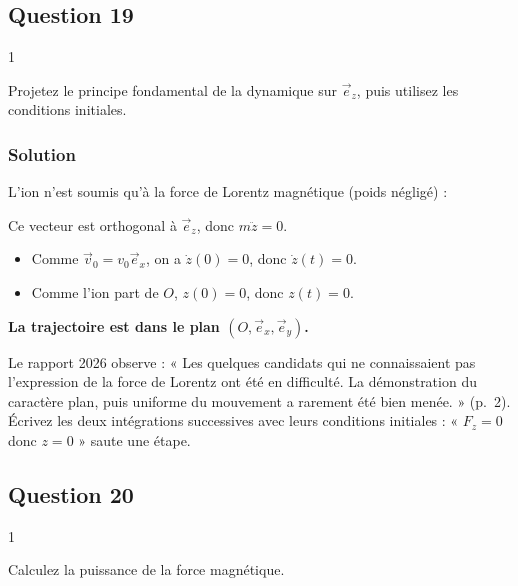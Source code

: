 \documentclass[11pt,a4paper]{article}
\providecommand{\tightlist}{\setlength{\itemsep}{0pt}\setlength{\parskip}{0pt}}
\newcommand{\equationajustee}[1]{%
  \sbox{\boiteequation}{$\displaystyle #1$}%
  \ifdim\wd\boiteequation>\linewidth
    \[\resizebox{\linewidth}{!}{\usebox{\boiteequation}}\]%
  \else
    \[#1\]%
  \fi}
\begin{document}
\hypertarget{question-19}{%
\subsection{Question 19}\label{question-19}}

\begin{indication}{1}

Projetez le principe fondamental de la dynamique sur \(\vec e_z\), puis utilisez les conditions initiales.

\end{indication}

\hypertarget{solution-18}{%
\subsubsection{Solution}\label{solution-18}}

L'ion n'est soumis qu'à la force de Lorentz magnétique (poids négligé) :

\equationajustee{m\frac{\mathrm d\vec v}{\mathrm dt}=e\vec v\wedge B\vec e_z}

Ce vecteur est orthogonal à \(\vec e_z\), donc \(m\ddot z=0\).

\begin{itemize}
\tightlist
\item
  Comme \(\vec v_0=v_0\vec e_x\), on a \(\dot z(0)=0\), donc \(\dot z(t)=0\).
\item
  Comme l'ion part de \(O\), \(z(0)=0\), donc \(z(t)=0\).
\end{itemize}

\textbf{La trajectoire est dans le plan \((O,\vec e_x,\vec e_y)\).}

\begin{jury}

Le rapport 2026 observe : « Les quelques candidats qui ne connaissaient pas l'expression de la force de Lorentz ont été en difficulté. La démonstration du caractère plan, puis uniforme du mouvement a rarement été bien menée. » (p.~2). Écrivez les deux intégrations successives avec leurs conditions initiales : « \(F_z=0\) donc \(z=0\) » saute une étape.

\end{jury}

\hypertarget{question-20}{%
\subsection{Question 20}\label{question-20}}

\begin{indication}{1}

Calculez la puissance de la force magnétique.

\end{indication}
\end{document}
